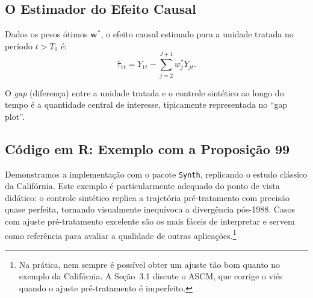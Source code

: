 \documentclass[12pt, a4paper, openany]{book}
\begin{document}
\subsection{O Estimador do Efeito Causal}

Dados os pesos ótimos $\mathbf{w}^*$, o efeito causal estimado para a unidade tratada no período $t > T_0$ é:
\begin{equation}
  \hat{\tau}_{1t} = Y_{1t} - \sum_{j=2}^{J+1} w_j^* Y_{jt}.
  \label{eq:effect}
\end{equation}

O \textit{gap} (diferença) entre a unidade tratada e o controle sintético ao longo do tempo é a quantidade central de interesse, tipicamente representada no ``gap plot''.


\subsection{Código em R: Exemplo com a Proposição 99}

Demonstramos a implementação com o pacote \texttt{Synth}, replicando o estudo clássico da Califórnia. Este exemplo é particularmente adequado do ponto de vista didático: o controle sintético replica a trajetória pré-tratamento com precisão quase perfeita, tornando visualmente inequívoca a divergência pós-1988. Casos com ajuste pré-tratamento excelente são os mais fáceis de interpretar e servem como referência para avaliar a qualidade de outras aplicações.\footnote{Na prática, nem sempre é possível obter um ajuste tão bom quanto no exemplo da Califórnia. A Seção~3.1 discute o ASCM, que corrige o viés quando o ajuste pré-tratamento é imperfeito.}
\end{document}
